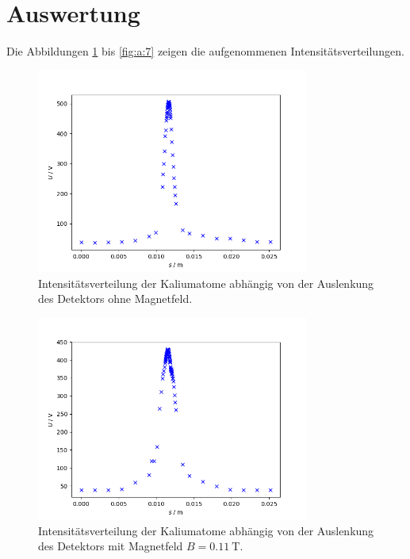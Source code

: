 \section{Auswertung}
\label{sec:Auswertung}
Die Abbildungen \ref{fig:a:0} bis \ref{fig:a:7} zeigen die aufgenommenen Intensitätsverteilungen.
\begin{figure}
\centering
\includegraphics[width=0.8\textwidth]{python/plots/plot_0.png}
\caption{Intensitätsverteilung der Kaliumatome abhängig von der Auslenkung des Detektors ohne Magnetfeld.}
\label{fig:a:0}
\end{figure}
\begin{figure}
\centering
\includegraphics[width=0.8\textwidth]{python/plots/plot_1.png}
\caption{Intensitätsverteilung der Kaliumatome abhängig von der Auslenkung des Detektors mit Magnetfeld $B=\SI{0.11}{\tesla}$.}
\label{fig:a:1}
\end{figure}
